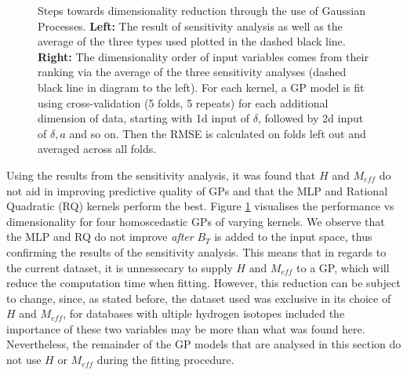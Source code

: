 \documentclass[a4paper, twoside, final, 12pt]{article}
\begin{document}
{\begin{figure}
\begin{subfigure}{0.48\linewidth}
	\end{subfigure}
	\caption{Steps towards dimensionality reduction through the use of Gaussian Processes. \textbf{Left:} The result of sensitivity analysis as well as the average of the three types used plotted in the dashed black line. \textbf{Right:} The dimensionality order of input variables comes from their ranking via the average of the three sensitivity analyses (dashed black line in diagram to the left). For each kernel, a GP model is fit using cross-validation (5 folds, 5 repeats) for each additional dimension of data, starting with 1d input of $\delta$, followed by 2d input of $\delta, a$ and so on. Then the RMSE is calculated on folds left out and averaged across all folds. } \label{fig:GP_dim}
\end{figure}

Using the results from the sensitivity analysis, it was found that $H$ and $M_{eff}$ do not aid in improving predictive quality of GPs and that the MLP and Rational Quadratic (RQ) kernels perform the best. Figure \ref{fig:GP_dim} visualises the performance vs dimensionality for four homoscedastic GPs of varying kernels.  We observe that the MLP and RQ do not improve \textit{after} $B_T$ is added to the input space, thus confirming the results of the sensitivity analysis. This means that in regards to the current dataset, it is unnessecary to supply $H \text{ and } M_{eff}$ to a GP, which will reduce the computation time when fitting. However, this reduction can be subject to change, since, as stated before, the dataset used was exclusive in its choice of $H$ and $M_{eff}$, for databases with ultiple hydrogen isotopes included the importance of these two variables may be more than what was found here. Nevertheless, the remainder of the GP models that are analysed in this section do not use $H$ or $M_{eff}$ during the fitting procedure. 

}
\end{document}
